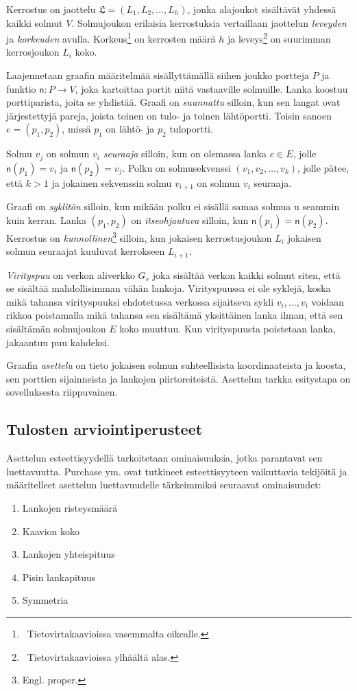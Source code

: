 \documentclass[finnish,12pt]{article}
\begin{document}
Kerrostus on jaottelu $\mathfrak{L} = (L_1, L_2, \dots, L_h)$, jonka alajoukot sisältävät yhdessä kaikki solmut $V$.
Solmujoukon erilaisia kerrostuksia vertaillaan jaottelun \emph{leveyden} ja \emph{korkeuden} avulla.
Korkeus\footnote{\ Tietovirtakaavioissa vasemmalta oikealle.} on kerrosten määrä $h$ ja leveys\footnote{\ Tietovirtakaavioissa ylhäältä alas.} on suurimman kerrosjoukon $L_i$ koko.

Laajennetaan graafin määritelmää sisällyttämällä siihen joukko portteja $P$ ja funktio $\mathsf{n} : P \rightarrow V$, joka kartoittaa portit niitä vastaaville solmuille.
Lanka koostuu porttiparista, joita se yhdistää. Graafi on \emph{suunnattu} silloin, kun sen langat ovat järjestettyjä pareja, joista toinen on tulo- ja toinen lähtöportti.
Toisin sanoen $e = (p_1, p_2)$, missä $p_1$ on lähtö- ja $p_2$ tuloportti.

Solmu $v_j$ on solmun $v_i$ \emph{seuraaja} silloin, kun on olemassa lanka $e \in E$, jolle $\mathsf{n}(p_1) = v_i$ ja $\mathsf{n}(p_2) = v_j$.
Polku on solmusekvenssi $(v_1, v_2, \dots , v_k)$, jolle pätee, että $k>1$ ja jokainen sekvenssin solmu $v_{i+1}$ on solmun $v_i$ seuraaja.

Graafi on \emph{syklitön} silloin, kun mikään polku ei sisällä samaa solmua u	seammin kuin kerran.
Lanka $(p_1, p_2)$ on \emph{itseohjautuva} silloin, kun $\mathsf{n}(p_1) = \mathsf{n}(p_2)$.
Kerrostus on \emph{kunnollinen}\footnote{Engl. proper.} silloin, kun jokaisen kerrostusjoukon $L_i$ jokaisen solmun seuraajat kuuluvat kerrokseen $L_{i+1}$.

\emph{Virityspuu} on verkon aliverkko $G_s$ joka sisältää verkon kaikki solmut siten, että se sisältää mahdollisimman vähän lankoja.
Virityspuussa ei ole syklejä, koska mikä tahansa virityspuuksi ehdotetussa verkossa sijaitseva sykli $v_i, ... , v_i$ voidaan rikkoa poistamalla mikä tahansa sen sisältämä yksittäinen lanka ilman, että sen sisältämän solmujoukon $E$ koko muuttuu.
Kun virityspuusta poistetaan lanka, jakaantuu puu kahdeksi.

Graafin \emph{asettelu} on tieto jokaisen solmun suhteellisista koordinaateista ja koosta, sen porttien sijainneista ja lankojen piirtoreiteistä. 
Asettelun tarkka esitystapa on sovelluksesta riippuvainen.

 		\subsection{Tulosten arviointiperusteet}

Asettelun esteettisyydellä tarkoitetaan ominaisuuksia, jotka parantavat sen luettavuutta.
Purchase ym. \cite{RefWorks:47} ovat tutkineet esteettisyyteen vaikuttavia tekijöitä ja määritelleet asettelun luettavuudelle tärkeimmiksi seuraavat ominaisuudet: 
\begin{enumerate}
  \item Lankojen risteysmäärä
  \item Kaavion koko
  \item Lankojen yhteispituus
  \item Pisin lankapituus	
  \item Symmetria
\end{enumerate}
\end{document}
